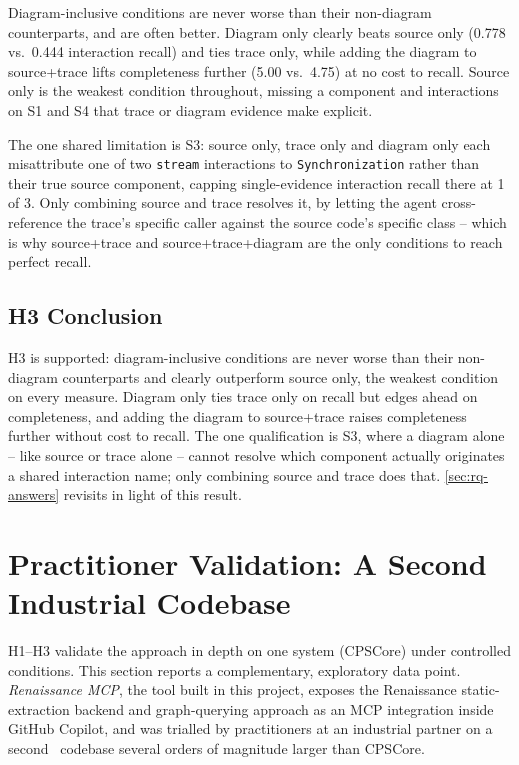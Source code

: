 Diagram-inclusive conditions are never worse than their non-diagram
counterparts, and are often better. Diagram only clearly beats source
only (0.778 vs.\ 0.444 interaction recall) and ties trace only, while
adding the diagram to source+trace lifts completeness further (5.00
vs.\ 4.75) at no cost to recall. Source only is the weakest condition
throughout, missing a component and interactions on S1 and S4 that
trace or diagram evidence make explicit.

The one shared limitation is S3: source only, trace only and diagram
only each misattribute one of two \texttt{stream} interactions to
\texttt{Synchronization} rather than their true source component,
capping single-evidence interaction recall there at 1 of 3. Only
combining source and trace resolves it, by letting the agent
cross-reference the trace's specific caller against the source code's
specific class -- which is why source+trace and source+trace+diagram
are the only conditions to reach perfect recall.

\subsection{H3 Conclusion}

H3 is supported: diagram-inclusive conditions are never worse than
their non-diagram counterparts and clearly outperform source only, the
weakest condition on every measure. Diagram only ties trace only on
recall but edges ahead on completeness, and adding the diagram to
source+trace raises completeness further without cost to recall. The
one qualification is S3, where a diagram alone -- like source or trace
alone -- cannot resolve which component actually originates a shared
interaction name; only combining source and trace does that.
\cref{sec:rq-answers} revisits \rqthree in light of this result.

\section{Practitioner Validation: A Second Industrial Codebase}\label{sec:practitioner}

H1--H3 validate the approach in depth on one system (CPSCore) under
controlled conditions. This section reports a complementary, exploratory
data point. \emph{Renaissance MCP}, the tool built in this project,
exposes the Renaissance static-extraction backend and graph-querying
approach as an MCP integration inside GitHub Copilot, and was trialled
by practitioners at an industrial partner on a second \Cpp\ codebase
several orders of magnitude larger than CPSCore.

